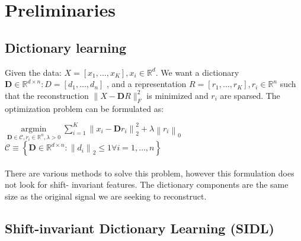 \documentclass[11pt,a4paper]{article}
\begin{document}
 



\section{Preliminaries}


\subsection{ Dictionary learning  }
Given the data: $ X=\left[x_{1}, \ldots, x_{K}\right], x_{i} \in \mathbb{R}^{d} $. 
We want a dictionary $\mathbf{D} \in \mathbb{R}^{d \times n}: D=\left[d_{1}, \ldots, d_{n}\right]$ ,
and a representation $R=\left[r_{1}, \ldots, r_{K}\right], r_{i} \in \mathbb{R}^{n}$ such that the reconstruction $\|X-\mathbf{D} R\|_{F}^{2}$ is minimized and $r_{i}$ are sparsed. The optimization problem can be formulated as: 

$\underset{\mathbf{D} \in \mathcal{C}, r_{i} \in \mathbb{R}^{n}, \lambda>0} {\operatorname{argmin}} \sum_{i=1}^{K}\left\|x_{i}-\mathbf{D} r_{i}\right\|_{2}^{2}+\lambda\left\|r_{i}\right\|_{0}$ \\   $\mathcal{C} \equiv\left\{\mathbf{D} \in \mathbb{R}^{d \times n}:\left\|d_{i}\right\|_{2} \leq 1 \forall i=1, \ldots, n\right\} $
\\ \\
There are various methods to solve this problem, however this formulation does not look for shift- invariant features. The dictionary components are the same size as the original signal we are seeking to reconstruct.

\subsection{ Shift-invariant Dictionary Learning (SIDL)  }
\end{document}
